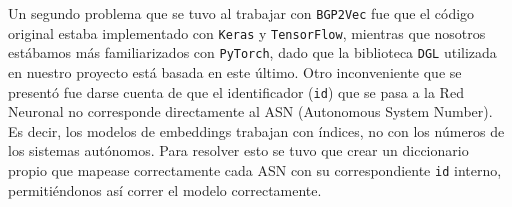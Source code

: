 
Un segundo problema que se tuvo al trabajar con \texttt{BGP2Vec} fue que el código original estaba implementado con \texttt{Keras} y \texttt{TensorFlow}, mientras que nosotros 
estábamos más familiarizados con \texttt{PyTorch}, dado que la biblioteca \texttt{DGL} utilizada en nuestro proyecto está basada en este último. Otro inconveniente que se presentó fue darse cuenta de que el identificador (\texttt{id}) que se pasa a la Red Neuronal no corresponde directamente al ASN (Autonomous System Number). Es decir, los modelos de embeddings trabajan con índices, no con los números de los sistemas autónomos. Para resolver esto se tuvo que crear un diccionario propio que mapease correctamente cada ASN con su correspondiente \texttt{id} interno, permitiéndonos así correr el modelo correctamente.\\




    





    

